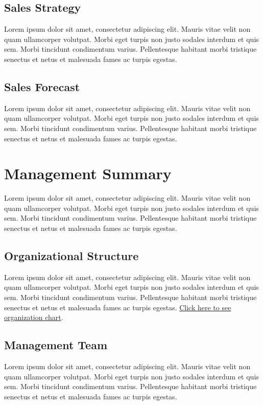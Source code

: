 \documentclass[11pt]{article}
\begin{document}
\subsection{Sales Strategy}
Lorem ipsum dolor sit amet, consectetur adipiscing elit. Mauris vitae velit 
non quam ullamcorper volutpat. Morbi eget turpis non justo sodales interdum 
et quis sem. Morbi tincidunt condimentum varius. Pellentesque habitant morbi 
tristique senectus et netus et malesuada fames ac turpis egestas.\newline
\subsection{Sales Forecast}
Lorem ipsum dolor sit amet, consectetur adipiscing elit. Mauris vitae velit 
non quam ullamcorper volutpat. Morbi eget turpis non justo sodales interdum 
et quis sem. Morbi tincidunt condimentum varius. Pellentesque habitant morbi 
tristique senectus et netus et malesuada fames ac turpis egestas.\newline
\pagebreak

\section{Management Summary}
Lorem ipsum dolor sit amet, consectetur adipiscing elit. Mauris vitae velit 
non quam ullamcorper volutpat. Morbi eget turpis non justo sodales interdum 
et quis sem. Morbi tincidunt condimentum varius. Pellentesque habitant morbi 
tristique senectus et netus et malesuada fames ac turpis egestas.\newline
\subsection{Organizational Structure}
Lorem ipsum dolor sit amet, consectetur adipiscing elit. Mauris vitae velit 
non quam ullamcorper volutpat. Morbi eget turpis non justo sodales interdum 
et quis sem. Morbi tincidunt condimentum varius. Pellentesque habitant morbi 
tristique senectus et netus et malesuada fames ac turpis egestas.\newline
\hyperlink{ref_org_chart}{Click here to see organization chart}.
\subsection{Management Team}
Lorem ipsum dolor sit amet, consectetur adipiscing elit. Mauris vitae velit 
non quam ullamcorper volutpat. Morbi eget turpis non justo sodales interdum 
et quis sem. Morbi tincidunt condimentum varius. Pellentesque habitant morbi 
tristique senectus et netus et malesuada fames ac turpis egestas.\newline
\end{document}
